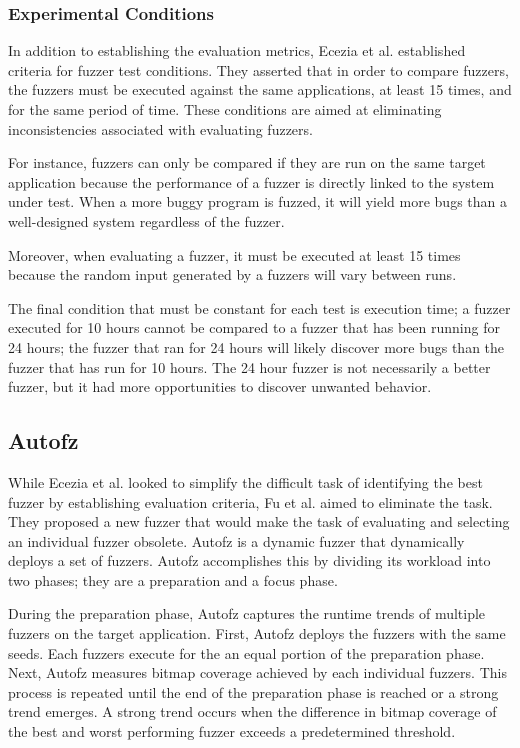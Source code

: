 \subsubsection{Experimental Conditions}
In addition to establishing the evaluation metrics, Ecezia et al. established  criteria for fuzzer 
test conditions. They asserted that in order to compare fuzzers, the fuzzers must be executed 
against the same applications, at least 15 times, and for the same period of time. These conditions 
are aimed at eliminating inconsistencies associated with evaluating fuzzers. 

For instance, fuzzers can only be compared if they are run on the same target application because 
the performance of a fuzzer is directly linked to the system under test. When a more buggy program 
is fuzzed, it will yield more bugs than a well-designed system regardless of the fuzzer. 

Moreover, when evaluating a fuzzer, it must be executed at least 15 times because the random input 
generated by a fuzzers will vary between runs.

The final condition that must be constant for each test is execution time; a fuzzer executed for 
10 hours cannot be compared to a fuzzer that has been running for 24 hours; the fuzzer that ran for 
24 hours will likely discover more bugs than the fuzzer that has run for 10 hours. The 24 hour fuzzer 
is not necessarily a better fuzzer, but it had more opportunities to discover unwanted behavior. \cite{Ecezia}

\subsection{Autofz}
While Ecezia et al. looked to simplify the difficult task of identifying the best fuzzer by establishing evaluation criteria, Fu et al. aimed to eliminate the task. They proposed a new fuzzer that would make the task of evaluating and selecting an individual fuzzer obsolete. Autofz is a dynamic fuzzer that dynamically deploys a set of fuzzers. Autofz accomplishes this by dividing its workload into two phases; they are a preparation and a focus phase.

During the preparation phase, Autofz captures the runtime trends of multiple fuzzers on the target application. First, Autofz deploys the fuzzers with the same seeds. Each fuzzers execute for the an equal portion of the preparation phase. Next, Autofz measures bitmap coverage achieved by each individual fuzzers. This process is repeated until the end of the preparation phase is reached or a strong trend emerges. A strong trend occurs when the difference in bitmap coverage of the best and worst performing fuzzer exceeds a predetermined threshold.

